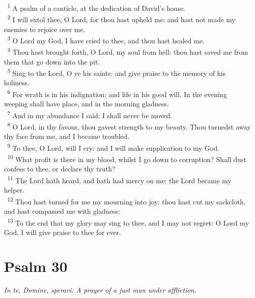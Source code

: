 \documentclass[a5paper,12pt]{article}
\begin{document}
\begin{multicols*}{2}
~\textsuperscript{1} A psalm of a canticle, at the dedication of David's house.\\
~\textsuperscript{2} I will extol thee, O Lord, for thou hast upheld me: and hast not made my enemies to rejoice over me.\\
~\textsuperscript{3} O Lord my God, I have cried to thee, and thou hast healed me.\\
~\textsuperscript{4} Thou hast brought forth, O Lord, my soul from hell: thou hast saved me from them that go down into the pit.\\
~\textsuperscript{5} Sing to the Lord, O ye his saints: and give praise to the memory of his holiness.\\
~\textsuperscript{6} For wrath is in his indignation; and life in his good will. In the evening weeping shall have place, and in the morning gladness.\\
~\textsuperscript{7} And in my abundance I said: I shall never be moved.\\
~\textsuperscript{8} O Lord, in thy favour, thou gavest strength to my beauty. Thou turnedst away thy face from me, and I became troubled.\\
~\textsuperscript{9} To thee, O Lord, will I cry: and I will make supplication to my God.\\
~\textsuperscript{10} What profit is there in my blood, whilst I go down to corruption? Shall dust confess to thee, or declare thy truth?\\
~\textsuperscript{11} The Lord hath heard, and hath had mercy on me: the Lord became my helper.\\
~\textsuperscript{12} Thou hast turned for me my mourning into joy: thou hast cut my sackcloth, and hast compassed me with gladness:\\
~\textsuperscript{13} To the end that my glory may sing to thee, and I may not regret: O Lord my God, I will give praise to thee for ever.\\

\section{Psalm 30}
\label{sec:orgd4af231}
\emph{In te, Domine, speravi. A prayer of a just man under affliction.}\\


\end{multicols*}
\end{document}
